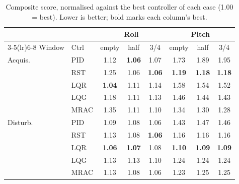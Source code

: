 \begin{table}[!ht]
\centering
\caption{Composite score, normalised against the best controller of each case (1.00 = best). Lower is better; bold marks each column's best.}
\label{tab:scores}
\footnotesize
\setlength{\tabcolsep}{4pt}
\begin{tabular}{ll ccc ccc}
\toprule
& & \multicolumn{3}{c}{Roll} & \multicolumn{3}{c}{Pitch} \\
\cmidrule(lr){3-5}\cmidrule(lr){6-8}
Window & Ctrl & empty & half & 3/4 & empty & half & 3/4 \\
\midrule
Acquis. & PID & 1.12 & \textbf{1.06} & 1.07 & 1.73 & 1.89 & 1.95 \\
 & RST & 1.25 & 1.06 & \textbf{1.06} & \textbf{1.19} & \textbf{1.18} & \textbf{1.18} \\
 & LQR & \textbf{1.04} & 1.11 & 1.14 & 1.58 & 1.54 & 1.52 \\
 & LQG & 1.18 & 1.11 & 1.13 & 1.46 & 1.44 & 1.43 \\
 & MRAC & 1.35 & 1.11 & 1.10 & 1.34 & 1.30 & 1.28 \\
\midrule
Disturb. & PID & 1.09 & 1.08 & 1.06 & 1.43 & 1.47 & 1.46 \\
 & RST & 1.13 & 1.08 & \textbf{1.06} & 1.16 & 1.16 & 1.16 \\
 & LQR & \textbf{1.06} & \textbf{1.07} & 1.08 & \textbf{1.10} & \textbf{1.09} & \textbf{1.09} \\
 & LQG & 1.13 & 1.13 & 1.10 & 1.24 & 1.24 & 1.24 \\
 & MRAC & 1.13 & 1.08 & 1.06 & 1.23 & 1.25 & 1.25 \\
\bottomrule
\end{tabular}
\end{table}